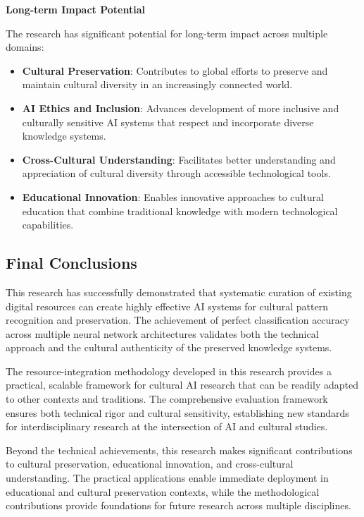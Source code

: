 \documentclass[12pt,a4paper]{article}
\begin{document}
\textbf{Long-term Impact Potential}

The research has significant potential for long-term impact across multiple domains:

\begin{itemize}
\item \textbf{Cultural Preservation}: Contributes to global efforts to preserve and maintain cultural diversity in an increasingly connected world.
\item \textbf{AI Ethics and Inclusion}: Advances development of more inclusive and culturally sensitive AI systems that respect and incorporate diverse knowledge systems.
\item \textbf{Cross-Cultural Understanding}: Facilitates better understanding and appreciation of cultural diversity through accessible technological tools.
\item \textbf{Educational Innovation}: Enables innovative approaches to cultural education that combine traditional knowledge with modern technological capabilities.
\end{itemize}

\subsection{Final Conclusions}

This research has successfully demonstrated that systematic curation of existing digital resources can create highly effective AI systems for cultural pattern recognition and preservation. The achievement of perfect classification accuracy across multiple neural network architectures validates both the technical approach and the cultural authenticity of the preserved knowledge systems.

The resource-integration methodology developed in this research provides a practical, scalable framework for cultural AI research that can be readily adapted to other contexts and traditions. The comprehensive evaluation framework ensures both technical rigor and cultural sensitivity, establishing new standards for interdisciplinary research at the intersection of AI and cultural studies.

Beyond the technical achievements, this research makes significant contributions to cultural preservation, educational innovation, and cross-cultural understanding. The practical applications enable immediate deployment in educational and cultural preservation contexts, while the methodological contributions provide foundations for future research across multiple disciplines.
\end{document}

